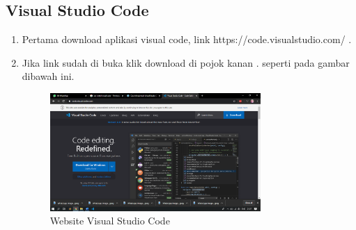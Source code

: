 \subsection{Visual Studio Code}
\begin{enumerate}
\item Pertama download aplikasi visual code, link https://code.visualstudio.com/ .

\item Jika link sudah di buka klik download di pojok kanan . seperti pada gambar dibawah ini.
	\begin{figure}[H]
		\includegraphics[width=8cm]{figures/instalasi/vsc1.png}
		\centering
		\caption{Website Visual Studio Code}
	\end{figure}
	

\end{enumerate}
